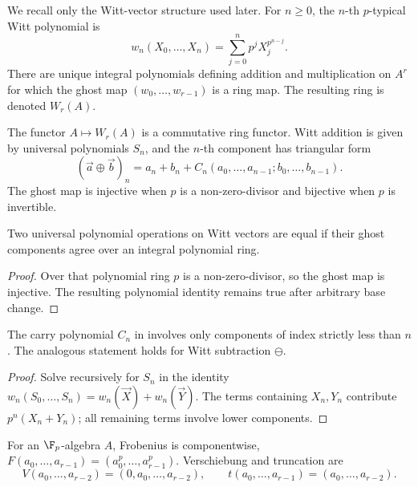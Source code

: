 We recall only the Witt-vector structure used later. For $n\geq0$, the
$n$-th $p$-typical Witt polynomial is
\[
    w_n(X_0,\dots,X_n)=\sum_{j=0}^n p^jX_j^{p^{n-j}}.
\]
There are unique integral polynomials defining addition and multiplication on
$A^r$ for which the ghost map $(w_0,\dots,w_{r-1})$ is a ring map. The
resulting ring is denoted $W_r(A)$.

\begin{theorem}
\label{theorem:witt_ring_structure}
The functor $A\mapsto W_r(A)$ is a commutative ring functor. Witt addition is
given by universal polynomials $S_n$, and the $n$-th component has triangular
form
\begin{equation}\label{eq:witt_addition_shape}
   (\vec a\oplus\vec b)_n=a_n+b_n+C_n(a_0,\dots,a_{n-1};b_0,\dots,b_{n-1}).
\end{equation}
The ghost map is injective when $p$ is a non-zero-divisor and bijective when
$p$ is invertible.
\end{theorem}

\begin{lemma}\label{lemma:ghost_principle}
Two universal polynomial operations on Witt vectors are equal if their ghost
components agree over an integral polynomial ring.
\end{lemma}
\begin{proof}
Over that polynomial ring $p$ is a non-zero-divisor, so the ghost map is
injective. The resulting polynomial identity remains true after arbitrary
base change.
\end{proof}

\begin{prop}\label{prop:witt_addition_shape}
The carry polynomial $C_n$ in  involves only
components of index strictly less than $n$. The analogous statement holds for
Witt subtraction $\ominus$.
\end{prop}
\begin{proof}
Solve recursively for $S_n$ in the identity
$w_n(S_0,\dots,S_n)=w_n(\vec X)+w_n(\vec Y)$. The terms containing $X_n,Y_n$
contribute $p^n(X_n+Y_n)$; all remaining terms involve lower components.
\end{proof}

For an $\F_p$-algebra $A$, Frobenius is componentwise,
$F(a_0,\dots,a_{r-1})=(a_0^p,\dots,a_{r-1}^p)$. Verschiebung and truncation are
\[
 V(a_0,\dots,a_{r-2})=(0,a_0,\dots,a_{r-2}),\qquad
 t(a_0,\dots,a_{r-1})=(a_0,\dots,a_{r-2}).
\]

